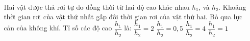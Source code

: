 \documentclass[Main.tex]{subfiles}
\begin{document}
	\begin{ex}
		Hai vật được thả rơi tự do đồng thời từ hai độ cao khác nhau $h_1$, và $h_2$. Khoảng thời gian rơi của vật thứ nhất gấp đôi thời gian rơi của vật thứ hai. Bỏ qua lực cản của không khí. Tỉ số các độ cao $\dfrac{h_1}{h_2}$ là:
		\choice
		{$\dfrac{h_1}{h_2}=2$}
		{$\dfrac{h_1}{h_2}=0,5$}
		{$\dfrac{h_1}{h_2}=4$}
		{$\dfrac{h_1}{h_2}=1$}
		\loigiai{}
	\end{ex}
\end{document}
